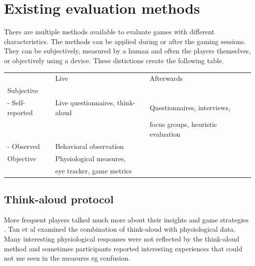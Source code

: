\chapter{Existing evaluation methods}
\label{ch:evaluationmethods}

There are multiple methods available to evaluate games with different characteristics. The methods can be applied during or after the gaming sessions. They can be subjectively, measured by a human and often the players themselves, or objectively using a device. These distictions create the following table.
 
\begin{table}[]
	\begin{tabular}{llll}
					& Live                                              & Afterwards\\
	Subjective      &                                                   & \\
	- Self-reported & Live questionnaires, think-aloud                  & Questionnaires, interviews,\\ 
					& 													& focus groups, heuristic evaluation \\
	- Observed      & Behavioral observation 							& \\
	Objective       & Physiological measures, 							& \\  
					& eye tracker, game metrics         				&\\                                                    
	\end{tabular}
\end{table}                                             								


\section{Think-aloud protocol}
More frequent players talked much more about their insights and game strategies \cite{blumberg2008impasse}.
Tan et al examined the combination of think-aloud with physiological data. Many interesting physiological responses were not reflected by the think-aloud method and sometimes participants reported interesting experiences that could not me seen in the measures eg confusion.

